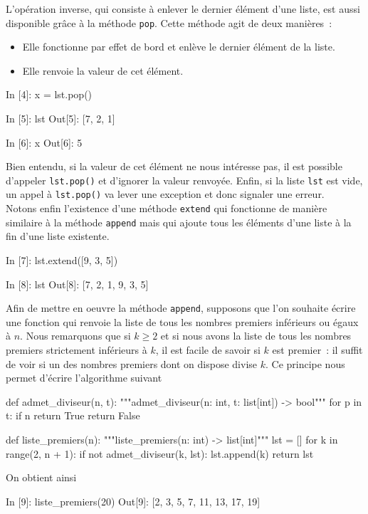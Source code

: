 \documentclass{magnolia}
\begin{document}
L'opération inverse, qui consiste à enlever le dernier élément d'une liste, est aussi disponible
grâce à la méthode \verb!pop!. Cette méthode agit de deux manières~:
\begin{itemize}
\item Elle fonctionne par effet de bord et enlève le dernier élément de la liste.
\item Elle renvoie la valeur de cet élément.
\end{itemize}
\begin{pythoncode}
In [4]: x = lst.pop()

In [5]: lst
Out[5]: [7, 2, 1]

In [6]: x
Out[6]: 5
\end{pythoncode}
Bien entendu, si la valeur de cet élément ne nous intéresse pas, il est possible d'appeler
\verb!lst.pop()! et d'ignorer la valeur renvoyée. Enfin, si la liste \verb!lst! est vide, un
appel à \verb!lst.pop()! va lever une exception et donc signaler une erreur.\\

Notons enfin l'existence d'une méthode \verb!extend! qui fonctionne de manière similaire
à la méthode \verb!append! mais qui ajoute tous les éléments d'une liste à la fin
d'une liste existente.
\begin{pythoncode}
In [7]: lst.extend([9, 3, 5])

In [8]: lst
Out[8]: [7, 2, 1, 9, 3, 5]
\end{pythoncode}
\vspace{2ex}

Afin de mettre en oeuvre la méthode \verb!append!,
supposons que l'on souhaite écrire une fonction qui renvoie la liste de tous
les nombres premiers inférieurs ou égaux à $n$. Nous remarquons que si $k\geq 2$ et si
nous avons la liste de tous les nombres premiers strictement inférieurs à $k$, il est
facile de savoir si $k$ est premier~: il suffit de voir si un des nombres premiers
dont on dispose divise $k$. Ce principe nous permet d'écrire l'algorithme suivant

\begin{pythoncodeline}
def admet_diviseur(n, t):
    """admet_diviseur(n: int, t: list[int]) -> bool"""
    for p in t:
        if n %
            return True
    return False

def liste_premiers(n):
    """liste_premiers(n: int) -> list[int]"""
    lst = []
    for k in range(2, n + 1):
        if not admet_diviseur(k, lst):
            lst.append(k)
    return lst
\end{pythoncodeline}
\noindent On obtient ainsi
\begin{pythoncode}
In [9]: liste_premiers(20)
Out[9]: [2, 3, 5, 7, 11, 13, 17, 19]
\end{pythoncode}
\end{document}
